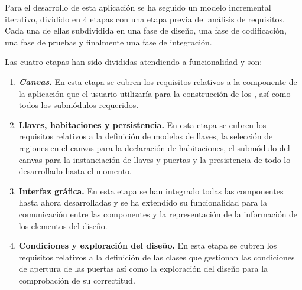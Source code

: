 Para el desarrollo de esta aplicación se ha seguido un modelo incremental iterativo, dividido en 4 etapas con una etapa previa del análisis de requisitos. Cada una de ellas subdividida en una fase de diseño, una fase de codificación, una fase de pruebas y finalmente una fase de integración.

Las cuatro etapas han sido divididas atendiendo a funcionalidad y son:
\begin{enumerate}
	\item \textbf{\textit{Canvas}.} En esta etapa se cubren los requisitos relativos a la componente de la aplicación que el usuario utilizaría para la construcción de los , así como todos los submódulos requeridos.
	\item \textbf{Llaves, habitaciones y persistencia.} En esta etapa se cubren los requisitos relativos a la definición de modelos de llaves, la selección de regiones en el canvas para la declaración de habitaciones, el submódulo del canvas para la instanciación de llaves y puertas y la presistencia de todo lo desarrollado hasta el momento.
	\item \textbf{Interfaz gráfica.} En esta etapa se han integrado todas las componentes hasta ahora desarrolladas y se ha extendido su funcionalidad para la comunicación entre las componentes y la representación de la información de los elementos del diseño.
	\item \textbf{Condiciones y exploración del diseño.} En esta etapa se cubren los requisitos relativos a la definición de las clases que gestionan las condiciones de apertura de las puertas así como la exploración del diseño para la comprobación de su correctitud.
\end{enumerate}